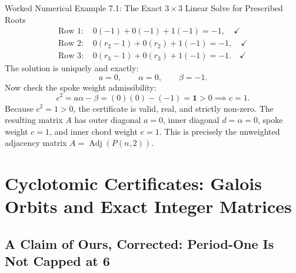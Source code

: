 \documentclass[11pt]{article}
\begin{document}
\begin{callbox}{Worked Numerical Example 7.1: The Exact $3 \times 3$ Linear Solve for Prescribed Roots}
\begin{align}
  \text{Row 1: } & 0(-1) + 0(-1) + 1(-1) = -1, \quad \checkmark \\
  \text{Row 2: } & 0(r_2 - 1) + 0(r_2) + 1(-1) = -1, \quad \checkmark \\
  \text{Row 3: } & 0(r_3 - 1) + 0(r_3) + 1(-1) = -1. \quad \checkmark
\end{align}
The solution is uniquely and exactly:
\begin{equation}
  a = 0, \qquad \alpha = 0, \qquad \beta = -1.
\end{equation}
Now check the spoke weight admissibility:
\begin{equation}
  c^2 = a\alpha - \beta = (0)(0) - (-1) = \mathbf{1} > 0 \implies c = 1.
\end{equation}
Because $c^2 = 1 > 0$, the certificate is valid, real, and strictly non-zero.
The resulting matrix $A$ has outer diagonal $a=0$, inner diagonal $d=\alpha=0$, spoke weight $c=1$, and inner chord weight $e=1$.
This is precisely the unweighted adjacency matrix $A = \operatorname{Adj}(P(n,2))$.
\end{callbox}

\newpage

\section{Cyclotomic Certificates: Galois Orbits and Exact Integer Matrices}

\subsection{A Claim of Ours, Corrected: Period-One Is Not Capped at 6}
\end{document}

